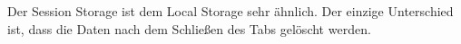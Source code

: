 Der Session Storage ist dem Local Storage sehr ähnlich. Der einzige Unterschied ist, dass die Daten nach dem Schließen des Tabs gelöscht werden. 

